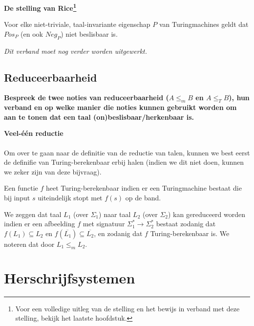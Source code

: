 \documentclass[
10pt,
a4paper,
oneside,
headinclude,footinclude, 
BCOR5mm,
]{scrartcl}
\begin{document}
\textbf{De stelling van Rice\footnote{Voor een volledige uitleg van de stelling en het bewijs in verband met deze stelling, bekijk het laatste hoofdstuk.}}

\begin{theorem}
	Voor elke niet-triviale, taal-invariante eigenschap $P$ van Turingmachines geldt dat $Pos_P$ (en ook $Neg_P$) niet beslisbaar is.
\end{theorem}

\emph{Dit verband moet nog verder worden uitgewerkt.}


\newpage
\subsection{Reduceerbaarheid}

\textbf{Bespreek de twee noties van reduceerbaarheid ($A \leq_m B$ en $A \leq_T B$), hun verband en op welke manier die noties kunnen gebruikt worden om aan te tonen dat een taal (on)beslisbaar/herkenbaar is.}

\vspace{5mm}
\textbf{Veel-\'e\'en reductie} \vspace{-4mm} \\ \\

\noindent Om over te gaan naar de definitie van de reductie van talen, kunnen we best eerst de definifie van Turing-berekenbaar erbij halen (indien we dit niet doen, kunnen we zeker zijn van deze bijvraag).

\begin{theorem}
	Een functie $f$ heet Turing-berekenbaar indien er een Turingmachine bestaat die bij input $s$ uiteindelijk stopt met $f(s)$ op de band.
\end{theorem}

\begin{theorem}
	We zeggen dat taal $L_1$ (over $\Sigma_1$) naar taal $L_2$ (over $\Sigma_2$) kan gereduceerd worden indien er een afbeelding $f$ met signatuur $\Sigma^*_1\longrightarrow \Sigma^*_2$ bestaat zodanig dat $f(L_1) \subseteq L_2$ en $f(\overline{L_1}) \subseteq \overline{L_2}$, en zodanig dat $f$ Turing-berekenbaar is. We noteren dat door $L_1 \leq_m L_2$.
\end{theorem}

\newpage
\section{Herschrijfsystemen}
\end{document}
